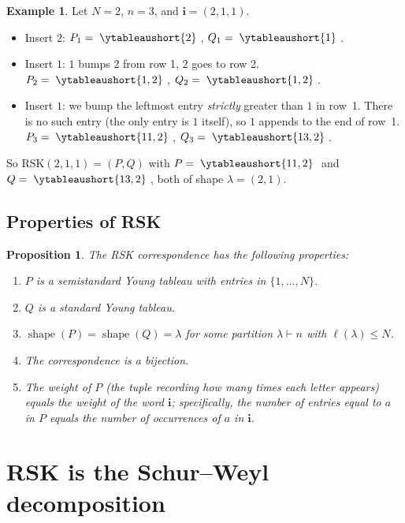\documentclass[12pt,a4paper]{article}
\newtheorem{proposition}[theorem]{Proposition}
\theoremstyle{definition}
\newtheorem{example}[theorem]{Example}
\theoremstyle{remark}
\newcommand{\shape}{\operatorname{shape}}
\begin{document}
\begin{example}\label{ex:RSK}
Let $N = 2$, $n = 3$, and $\mathbf{i} = (2, 1, 1)$.
\begin{itemize}
\item Insert $2$: $P_1 = \;\ytableaushort{2}\;$, \;
  $Q_1 = \;\ytableaushort{1}\;$.
\item Insert $1$: $1$ bumps $2$ from row 1, $2$ goes to row 2.
  $P_2 = \;\ytableaushort{1,2}\;$, \;
  $Q_2 = \;\ytableaushort{1,2}\;$.
\item Insert $1$: we bump the leftmost entry \emph{strictly} greater
  than $1$ in row~1. There is no such entry (the only entry is $1$
  itself), so $1$ appends to the end of row~1.
  $P_3 = \;\ytableaushort{11,2}\;$, \;
  $Q_3 = \;\ytableaushort{13,2}\;$.
\end{itemize}
So $\mathrm{RSK}(2,1,1) = (P, Q)$ with $P = \;\ytableaushort{11,2}\;$ and
$Q = \;\ytableaushort{13,2}\;$, both of shape $\lambda = (2,1)$.
\end{example}

\subsection{Properties of RSK}

\begin{proposition}\label{prop:RSK-props}
The RSK correspondence has the following properties:
\begin{enumerate}[label=(\alph*)]
\item $P$ is a semistandard Young tableau with entries in $\{1,\ldots,N\}$.
\item $Q$ is a standard Young tableau.
\item $\shape(P) = \shape(Q) = \lambda$ for some partition $\lambda
  \vdash n$ with $\ell(\lambda) \leqslant N$.
\item The correspondence is a bijection.
\item The \emph{weight} of $P$ (the tuple recording how many times
  each letter appears) equals the weight of the word $\mathbf{i}$;
  specifically, the number of entries equal to $a$ in $P$ equals the
  number of occurrences of $a$ in $\mathbf{i}$.
\end{enumerate}
\end{proposition}

\section{RSK is the Schur--Weyl decomposition}
\label{sec:RSK-is-SW}
\end{document}
